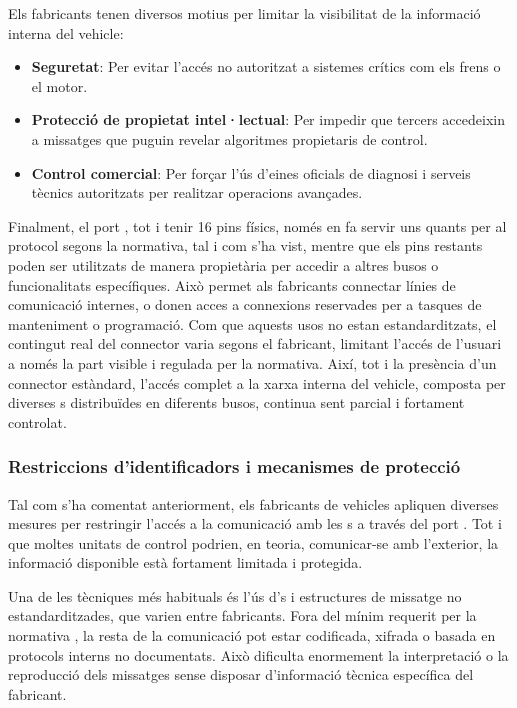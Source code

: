 \documentclass{tfgitic}[2024/07/01]
\begin{document}
Els fabricants tenen diversos motius per limitar la visibilitat de la informació interna del vehicle:

\begin{itemize}
  \item \textbf{Seguretat}: Per evitar l'accés no autoritzat a sistemes crítics com els frens o el motor.
  
  \item \textbf{Protecció de propietat intel·lectual}: Per impedir que tercers accedeixin a missatges que puguin revelar algoritmes propietaris de control.
  
  \item \textbf{Control comercial}: Per forçar l'ús d'eines oficials de diagnosi i serveis tècnics autoritzats per realitzar operacions avançades.
\end{itemize} 

Finalment, el port , tot i tenir 16 pins físics, només en fa servir uns quants per al protocol  segons la normativa, tal i com s'ha vist, mentre que 
els pins restants poden ser utilitzats de manera propietària per accedir a altres busos o funcionalitats específiques. Això permet als fabricants connectar línies de comunicació internes, 
o donen acces a connexions reservades per a tasques de manteniment o programació. Com que aquests usos no estan estandarditzats, el contingut real del connector  
varia segons el fabricant, limitant l'accés de l'usuari a només la part visible i regulada per la normativa. Així, tot i la presència d'un connector estàndard, 
l'accés complet a la xarxa interna del vehicle, composta per diverses s distribuïdes en diferents busos, continua sent parcial i fortament controlat.

\subsubsection{Restriccions d'identificadors i mecanismes de protecció}

Tal com s'ha comentat anteriorment, els fabricants de vehicles apliquen diverses mesures per restringir l'accés a la comunicació amb les s a través del port . 
Tot i que moltes unitats de control podrien, en teoria, comunicar-se amb l'exterior, la informació disponible està fortament limitada i protegida.

Una de les tècniques més habituals és l'ús d's i estructures de missatge no estandarditzades, que varien entre fabricants. Fora del mínim 
requerit per la normativa , la resta de la comunicació pot estar codificada, xifrada o basada en protocols interns no documentats. Això dificulta enormement 
la interpretació o la reproducció dels missatges sense disposar d'informació tècnica específica del fabricant.
\end{document}
